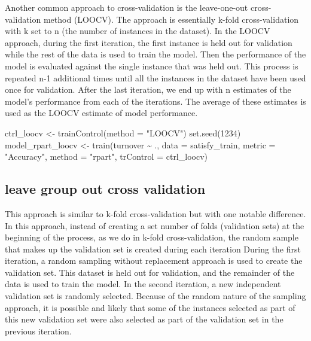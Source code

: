 \documentclass[
]{book}
\newenvironment{Shaded}{\begin{snugshade}}{\end{snugshade}}
\newcommand{\AttributeTok}[1]{\textcolor[rgb]{0.77,0.63,0.00}{#1}}
\newcommand{\DecValTok}[1]{\textcolor[rgb]{0.00,0.00,0.81}{#1}}
\newcommand{\FunctionTok}[1]{\textcolor[rgb]{0.00,0.00,0.00}{#1}}
\newcommand{\NormalTok}[1]{#1}
\newcommand{\OtherTok}[1]{\textcolor[rgb]{0.56,0.35,0.01}{#1}}
\newcommand{\SpecialCharTok}[1]{\textcolor[rgb]{0.00,0.00,0.00}{#1}}
\newcommand{\StringTok}[1]{\textcolor[rgb]{0.31,0.60,0.02}{#1}}
\begin{document}
Another common approach to cross-validation is the leave-one-out cross-validation
method (LOOCV). The approach is essentially k-fold cross-validation with k set to n (the number of instances in the dataset). In the LOOCV approach, during the first iteration, the first instance is held out for validation while the rest of the data is used to train the model.
Then the performance of the model is evaluated against the single instance that was
held out. This process is repeated n-1 additional times until all the instances in the dataset have been used once for validation. After the last iteration, we end up with n estimates of the model's performance from each of the iterations. The average of these estimates is used as the LOOCV estimate of model performance.

\begin{Shaded}
\begin{Highlighting}[]
\NormalTok{ctrl\_loocv }\OtherTok{\textless{}{-}} \FunctionTok{trainControl}\NormalTok{(}\AttributeTok{method =} \StringTok{"LOOCV"}\NormalTok{)}
\FunctionTok{set.seed}\NormalTok{(}\DecValTok{1234}\NormalTok{)}
\NormalTok{model\_rpart\_loocv }\OtherTok{\textless{}{-}} \FunctionTok{train}\NormalTok{(turnover }\SpecialCharTok{\textasciitilde{}}\NormalTok{ .,}
                           \AttributeTok{data =}\NormalTok{ satisfy\_train,}
                           \AttributeTok{metric =} \StringTok{"Accuracy"}\NormalTok{,}
                           \AttributeTok{method =} \StringTok{"rpart"}\NormalTok{,}
                           \AttributeTok{trControl =}\NormalTok{ ctrl\_loocv)}
\end{Highlighting}
\end{Shaded}

\hypertarget{leave-group-out-cross-validation-1}{%
\subsection{leave group out cross validation}\label{leave-group-out-cross-validation-1}}

This approach is similar to k-fold cross-validation but with one notable
difference. In this approach, instead of creating a set number of folds (validation sets) at the beginning of the process, as we do in k-fold cross-validation, the random sample that makes up the validation set is created during each iteration
During the first iteration, a random sampling without replacement approach is used
to create the validation set. This dataset is held out for validation, and the remainder of the data is used to train the model. In the second iteration, a new independent validation set is randomly selected. Because of the random nature of the sampling approach, it is possible and likely that some of the instances selected as part of this new validation set were also selected as part of the validation set in the previous iteration.
\end{document}
